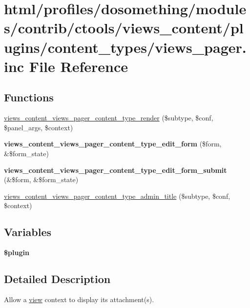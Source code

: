 \hypertarget{views__pager_8inc}{
\section{html/profiles/dosomething/modules/contrib/ctools/views\_\-content/plugins/content\_\-types/views\_\-pager.inc File Reference}
\label{views__pager_8inc}
}
\subsection*{Functions}
\begin{DoxyCompactItemize}
\item 
\hyperlink{views__pager_8inc_aa5e204ac9f668ab35572cdb1b0b4a699}{views\_\-content\_\-views\_\-pager\_\-content\_\-type\_\-render} (\$subtype, \$conf, \$panel\_\-args, \$context)
\item 
\hypertarget{views__pager_8inc_a9a1219e10b22bce59e2cc26ccaef9c24}{
{\bfseries views\_\-content\_\-views\_\-pager\_\-content\_\-type\_\-edit\_\-form} (\$form, \&\$form\_\-state)}
\label{views__pager_8inc_a9a1219e10b22bce59e2cc26ccaef9c24}

\item 
\hypertarget{views__pager_8inc_a831f7a4f0c54467d51e5a6909564200c}{
{\bfseries views\_\-content\_\-views\_\-pager\_\-content\_\-type\_\-edit\_\-form\_\-submit} (\&\$form, \&\$form\_\-state)}
\label{views__pager_8inc_a831f7a4f0c54467d51e5a6909564200c}

\item 
\hyperlink{views__pager_8inc_ab5b6c59c4a656235cd81fc7a3956ec23}{views\_\-content\_\-views\_\-pager\_\-content\_\-type\_\-admin\_\-title} (\$subtype, \$conf, \$context)
\end{DoxyCompactItemize}
\subsection*{Variables}
\begin{DoxyCompactItemize}
\item 
{\bfseries \$plugin}
\end{DoxyCompactItemize}


\subsection{Detailed Description}
Allow a \hyperlink{classview}{view} context to display its attachment(s). 

